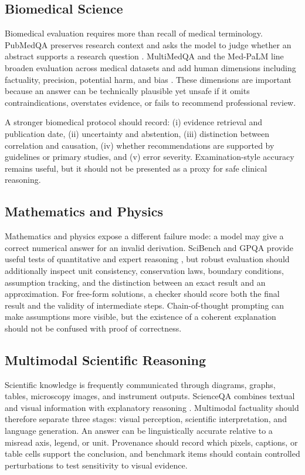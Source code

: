 \documentclass[manuscript,nonacm]{acmart}
\begin{document}
\subsection{Biomedical Science}\label{sec:biomedical}
Biomedical evaluation requires more than recall of medical terminology. PubMedQA preserves research context and asks the model to judge whether an abstract supports a research question \cite{jin2019pubmedqa}. MultiMedQA and the Med-PaLM line broaden evaluation across medical datasets and add human dimensions including factuality, precision, potential harm, and bias \cite{singhal2023large}. These dimensions are important because an answer can be technically plausible yet unsafe if it omits contraindications, overstates evidence, or fails to recommend professional review.

A stronger biomedical protocol should record: (i) evidence retrieval and publication date, (ii) uncertainty and abstention, (iii) distinction between correlation and causation, (iv) whether recommendations are supported by guidelines or primary studies, and (v) error severity. Examination-style accuracy remains useful, but it should not be presented as a proxy for safe clinical reasoning.

\subsection{Mathematics and Physics}\label{sec:mathphysics}
Mathematics and physics expose a different failure mode: a model may give a correct numerical answer for an invalid derivation. SciBench and GPQA provide useful tests of quantitative and expert reasoning \cite{wang2023scibench,rein2023gpqa}, but robust evaluation should additionally inspect unit consistency, conservation laws, boundary conditions, assumption tracking, and the distinction between an exact result and an approximation. For free-form solutions, a checker should score both the final result and the validity of intermediate steps. Chain-of-thought prompting can make assumptions more visible, but the existence of a coherent explanation should not be confused with proof of correctness.

\subsection{Multimodal Scientific Reasoning}\label{sec:multimodal}
Scientific knowledge is frequently communicated through diagrams, graphs, tables, microscopy images, and instrument outputs. ScienceQA combines textual and visual information with explanatory reasoning \cite{lu2022scienceqa}. Multimodal factuality should therefore separate three stages: visual perception, scientific interpretation, and language generation. An answer can be linguistically accurate relative to a misread axis, legend, or unit. Provenance should record which pixels, captions, or table cells support the conclusion, and benchmark items should contain controlled perturbations to test sensitivity to visual evidence.
\end{document}
